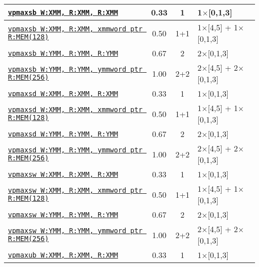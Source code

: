 \documentclass[a4paper,english,fontsize=9]{scrartcl}
\begin{document}
\begin{longtable}{p{}ccL{.25\textwidth}}
  \midrule
  \texttt{\href{https://felixcloutier.com/x86/PMAXSB:PMAXSW:PMAXSD:PMAXSQ.html}{vpmaxsb W:XMM, R:XMM, R:XMM}} & 0.33 & 1 & 1\(\times\)[0,1,3] \\
  \midrule
  \texttt{\href{https://felixcloutier.com/x86/PMAXSB:PMAXSW:PMAXSD:PMAXSQ.html}{vpmaxsb W:XMM, R:XMM, xmmword ptr R:MEM(128)}} & 0.50 & 1+1 & 1\(\times\)[4,5] + 1\(\times\)[0,1,3] \\
  \midrule
  \texttt{\href{https://felixcloutier.com/x86/PMAXSB:PMAXSW:PMAXSD:PMAXSQ.html}{vpmaxsb W:YMM, R:YMM, R:YMM}} & 0.67 & 2 & 2\(\times\)[0,1,3] \\
  \midrule
  \texttt{\href{https://felixcloutier.com/x86/PMAXSB:PMAXSW:PMAXSD:PMAXSQ.html}{vpmaxsb W:YMM, R:YMM, ymmword ptr R:MEM(256)}} & 1.00 & 2+2 & 2\(\times\)[4,5] + 2\(\times\)[0,1,3] \\
  \midrule
  \texttt{\href{https://felixcloutier.com/x86/PMAXSB:PMAXSW:PMAXSD:PMAXSQ.html}{vpmaxsd W:XMM, R:XMM, R:XMM}} & 0.33 & 1 & 1\(\times\)[0,1,3] \\
  \midrule
  \texttt{\href{https://felixcloutier.com/x86/PMAXSB:PMAXSW:PMAXSD:PMAXSQ.html}{vpmaxsd W:XMM, R:XMM, xmmword ptr R:MEM(128)}} & 0.50 & 1+1 & 1\(\times\)[4,5] + 1\(\times\)[0,1,3] \\
  \midrule
  \texttt{\href{https://felixcloutier.com/x86/PMAXSB:PMAXSW:PMAXSD:PMAXSQ.html}{vpmaxsd W:YMM, R:YMM, R:YMM}} & 0.67 & 2 & 2\(\times\)[0,1,3] \\
  \midrule
  \texttt{\href{https://felixcloutier.com/x86/PMAXSB:PMAXSW:PMAXSD:PMAXSQ.html}{vpmaxsd W:YMM, R:YMM, ymmword ptr R:MEM(256)}} & 1.00 & 2+2 & 2\(\times\)[4,5] + 2\(\times\)[0,1,3] \\
  \midrule
  \texttt{\href{https://felixcloutier.com/x86/PMAXSB:PMAXSW:PMAXSD:PMAXSQ.html}{vpmaxsw W:XMM, R:XMM, R:XMM}} & 0.33 & 1 & 1\(\times\)[0,1,3] \\
  \midrule
  \texttt{\href{https://felixcloutier.com/x86/PMAXSB:PMAXSW:PMAXSD:PMAXSQ.html}{vpmaxsw W:XMM, R:XMM, xmmword ptr R:MEM(128)}} & 0.50 & 1+1 & 1\(\times\)[4,5] + 1\(\times\)[0,1,3] \\
  \midrule
  \texttt{\href{https://felixcloutier.com/x86/PMAXSB:PMAXSW:PMAXSD:PMAXSQ.html}{vpmaxsw W:YMM, R:YMM, R:YMM}} & 0.67 & 2 & 2\(\times\)[0,1,3] \\
  \midrule
  \texttt{\href{https://felixcloutier.com/x86/PMAXSB:PMAXSW:PMAXSD:PMAXSQ.html}{vpmaxsw W:YMM, R:YMM, ymmword ptr R:MEM(256)}} & 1.00 & 2+2 & 2\(\times\)[4,5] + 2\(\times\)[0,1,3] \\
  \midrule
  \texttt{\href{https://felixcloutier.com/x86/PMAXUB:PMAXUW.html}{vpmaxub W:XMM, R:XMM, R:XMM}} & 0.33 & 1 & 1\(\times\)[0,1,3] \\

\end{longtable}
\end{document}

